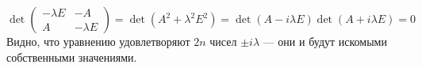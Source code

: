 \documentclass{article}
\begin{document}
$$\det \begin{pmatrix}-\lambda E&-A\\A&-\lambda E\end{pmatrix} = \det(A^2 + \lambda^2 E^2) = \det(A - i \lambda E) \det(A + i \lambda E) = 0$$
Видно, что уравнению удовлетворяют $2n$ чисел $\pm i \lambda$ --- они и будут искомыми собственными значениями.
\end{document}
